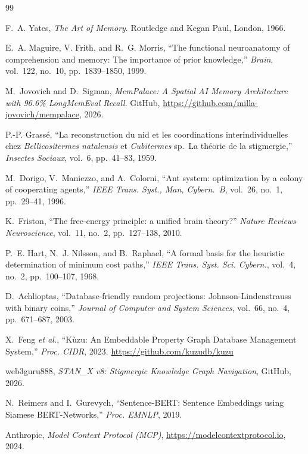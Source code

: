 \documentclass[11pt,a4paper]{article}
\begin{document}
\begin{thebibliography}{99}

F.~A. Yates,
\textit{The Art of Memory}.
Routledge and Kegan Paul, London, 1966.

E.~A. Maguire, V. Frith, and R.~G. Morris,
``The functional neuroanatomy of comprehension and memory: The importance of
prior knowledge,''
\textit{Brain}, vol.~122, no.~10, pp.~1839--1850, 1999.

M.~Jovovich and D.~Sigman,
\textit{MemPalace: A Spatial AI Memory Architecture with 96.6\% LongMemEval Recall}.
GitHub, \url{https://github.com/milla-jovovich/mempalace}, 2026.

P.-P. Grass\'e,
``La reconstruction du nid et les coordinations interindividuelles chez
\textit{Bellicositermes natalensis} et \textit{Cubitermes} sp.\ La th\'eorie de
la stigmergie,''
\textit{Insectes Sociaux}, vol.~6, pp.~41--83, 1959.

M.~Dorigo, V.~Maniezzo, and A.~Colorni,
``Ant system: optimization by a colony of cooperating agents,''
\textit{IEEE Trans. Syst., Man, Cybern.~B}, vol.~26, no.~1, pp.~29--41, 1996.

K.~Friston,
``The free-energy principle: a unified brain theory?''
\textit{Nature Reviews Neuroscience}, vol.~11, no.~2, pp.~127--138, 2010.

P.~E. Hart, N.~J. Nilsson, and B.~Raphael,
``A formal basis for the heuristic determination of minimum cost paths,''
\textit{IEEE Trans. Syst. Sci. Cybern.}, vol.~4, no.~2, pp.~100--107, 1968.

D.~Achlioptas,
``Database-friendly random projections: Johnson-Lindenstrauss with binary coins,''
\textit{Journal of Computer and System Sciences}, vol.~66, no.~4, pp.~671--687,
2003.

X.~Feng \textit{et al.},
``Kùzu: An Embeddable Property Graph Database Management System,''
\textit{Proc. CIDR}, 2023.
\url{https://github.com/kuzudb/kuzu}

web3guru888,
\textit{STAN\_X v8: Stigmergic Knowledge Graph Navigation},
GitHub, 2026.

N.~Reimers and I.~Gurevych,
``Sentence-BERT: Sentence Embeddings using Siamese BERT-Networks,''
\textit{Proc. EMNLP}, 2019.

Anthropic,
\textit{Model Context Protocol (MCP)},
\url{https://modelcontextprotocol.io}, 2024.


\end{thebibliography}
\end{document}
